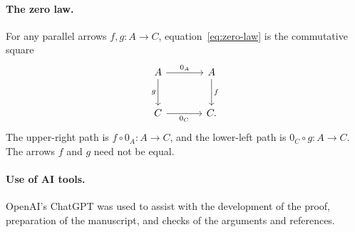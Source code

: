 \documentclass[11pt]{article}
\begin{document}
\paragraph{The zero law.}
For any parallel arrows $f,g:A\to C$,
equation~\eqref{eq:zero-law} is the commutative square
\[
\begin{tikzcd}[column sep=large,row sep=large]
 A\arrow[r,"0_A"]\arrow[d,"g"']&A\arrow[d,"f"]\\
 C\arrow[r,"0_C"']&C.
\end{tikzcd}
\]
The upper-right path is $f\circ0_A:A\to C$, and the lower-left
path is $0_C\circ g:A\to C$. The arrows $f$ and $g$ need not be equal.

\paragraph{Use of AI tools.}
OpenAI's ChatGPT was used to assist with the development of the proof,
preparation of the manuscript, and checks of the arguments and references.
\end{document}
